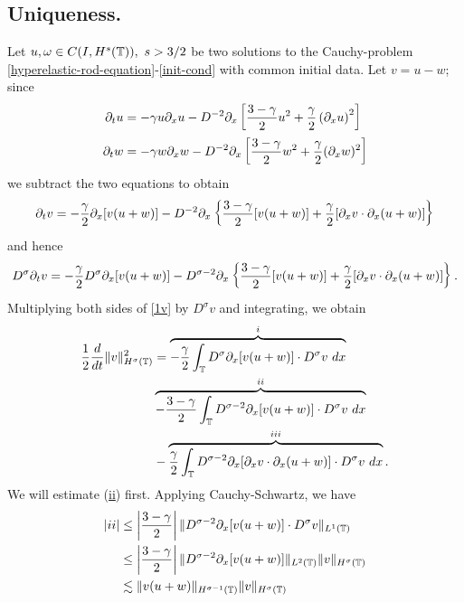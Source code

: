 \subsection{Uniqueness.}
%
%
Let $u,\omega \in C(I, H^s(\mathbb{T})), \ s > 3/2$ be two solutions to the
Cauchy-problem \eqref{hyperelastic-rod-equation}-\eqref{init-cond} with
common initial data. Let $v=u-w$; since
\begin{align*}
\partial_t u 
& = - \gamma u \partial_x u - D^{-2} \partial_x \left[ \frac{3-\gamma}{2} u^2 +
\frac{\gamma}{2}\left( \partial_x u \right)^2 \right]
\\
\partial_t w & = -\gamma w \partial_x w - D^{-2} \partial_x \left[
\frac{3-\gamma}{2} w^2 + \frac{\gamma}{2}(\partial_x w)^2 
\right]
\end{align*}
we subtract the two equations to obtain 
\begin{equation*}
\begin{split}
\partial_t v
= -\frac{\gamma}{2} \partial_x [v(u + w)] - D^{-2} \partial_x \left\{
\frac{3-\gamma}{2}[v(u+w)] + \frac{\gamma}{2}[\partial_x v \cdot \partial_x (u+w)]
\right\}
\end{split}
\end{equation*}
and hence
\begin{equation}
\begin{split}
D^\sigma \partial_t v = -\frac{\gamma}{2} D^\sigma \partial_x [v(u+w)] - D^{\sigma -2} \partial_x
\left\{ \frac{3-\gamma}{2} [v(u+w)] + \frac{\gamma}{2} [\partial_x v
\cdot \partial_x
(u+w)]
\right\}.
\label{1v}
\end{split}
\end{equation}
Multiplying both sides of \eqref{1v} by $D^\sigma v$ and integrating, we obtain
\begin{equation}
\begin{split}
\frac{1}{2} \frac{d}{dt} \|v\|_{H^\sigma(\mathbb{T})}^2
& =  \overbrace{-\frac{\gamma}{2} \int_{\mathbb{T}} D^\sigma \partial_x [v(u+w)] \cdot
D^\sigma v \ dx}^i
\\
& \overbrace{- \frac{3-\gamma}{2} \int_{\mathbb{T}}  D^{\sigma -2}
\partial_x[v(u+w)] \cdot
D^\sigma v \ dx}^{ii} 
\\
& - \overbrace{\frac{\gamma}{2} \int_{\mathbb{T}} D^{\sigma -2} \partial_x [ \partial_x v
\cdot \partial_x (u+w)]\cdot D^\sigma v \ dx }^{iii}.
\label{2v}
\end{split}
\end{equation}
We will estimate (\hyperref[2v]{ii}) first.
Applying Cauchy-Schwartz, we have 
\begin{equation*}
\begin{split}
|ii|
& \le \left | \frac{3-\gamma}{2} \right | \|D^{\sigma -2}
\partial_x [v(u+w)] \cdot D^\sigma
v  \|_{L^1(\mathbb{T})}
\\
& \le  \left | \frac{3-\gamma}{2} \right | \|D^{\sigma -2} \partial_x [v(u+w)]
\|_{L^2(\mathbb{T})} \|v\|_{H^\sigma(\mathbb{T})}
\\
& \lesssim \|v(u+w)\|_{H^{\sigma -1}(\mathbb{T})} \|v\|_{H^\sigma(\mathbb{T})}
\end{split}
\end{equation*}
